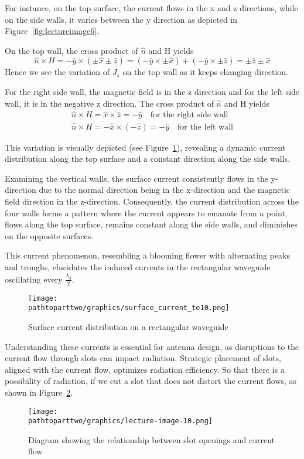 For instance, on the top surface, the current flows in the x and z directions, while on the side walls, it varies between the y direction as depicted in Figure~\ref{fig:lectureimage6}.

On the top wall, the cross product of $\hat{n}$ and H yields
\begin{dmath*}
\hat{n} \times H
= -\hat{y} \times (\pm\hat{x} \pm\hat{z})
= (-\hat{y} \times \pm\hat{x}) + (- \hat{y} \times \pm\hat{z})
= \pm\hat{z} \pm\hat{x}
\end{dmath*}
Hence we see the variation of $J_{s}$ on the top wall as it keeps changing direction.

For the right side wall, the magnetic field is in the z direction and for the left side wall, it is in the negative z direction. The cross product of $\hat{n}$ and H yields
\begin{align*}
\hat{n} \times H = \hat{x} \times \hat{z} = -\hat{y}\quad\text{for the right side wall}\\
\hat{n} \times H = -\hat{x} \times (-\hat{z}) = -\hat{y}\quad\text{for the left wall}
\end{align*}

This variation is visually depicted (see Figure~\ref{fig:surface_current_te10}), revealing a dynamic current distribution along the top surface and a constant direction along the side walls.

Examining the vertical walls, the surface current consistently flows in the y-direction due to the normal direction being in the x-direction and the magnetic field direction in the z-direction. Consequently, the current distribution across the four walls forms a pattern where the current appears to emanate from a point, flows along the top surface, remains constant along the side walls, and diminishes on the opposite surfaces.
	
This current phenomenon, resembling a blooming flower with alternating peaks and troughs, elucidates the induced currents in the rectangular waveguide oscillating every $\frac{\lambda_g}{2}$.
\begin{figure}[h]
\centering
\texttt{[image: \\pathtoparttwo/graphics/surface\_current\_te10.png]}
\caption{Surface current distribution on a rectangular waveguide}
\label{fig:surface_current_te10}
\end{figure}

Understanding these currents is essential for antenna design, as disruptions to the current flow through slots can impact radiation. Strategic placement of slots, aligned with the current flow, optimizes radiation efficiency.  So that there is a possibility of radiation, if we cut a slot that does not distort the current flows, as shown in Figure~\ref{fig:lectureimage10}.
\begin{figure}[h]
\centering
\texttt{[image: \\pathtoparttwo/graphics/lecture-image-10.png]}
\caption{Diagram showing the relationship between slot openings and current flow}
\label{fig:lectureimage10}
\end{figure}

